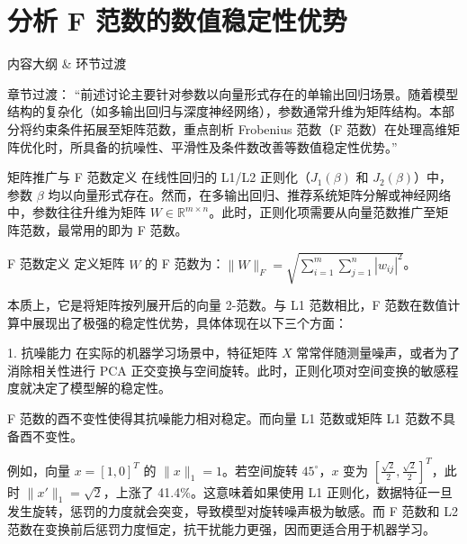 \documentclass[aspectratio=169]{beamer}
\begin{document}
\section{分析 F 范数的数值稳定性优势}

\begin{frame}{内容大纲 \& 环节过渡}
    \tableofcontents[currentsection]
    \vspace{0.5cm}
    \begin{block}{章节过渡：}
        “前述讨论主要针对参数以向量形式存在的单输出回归场景。随着模型结构的复杂化（如多输出回归与深度神经网络），参数通常升维为矩阵结构。本部分将约束条件拓展至矩阵范数，重点剖析 Frobenius 范数（F 范数）在处理高维矩阵优化时，所具备的抗噪性、平滑性及条件数改善等数值稳定性优势。”
    \end{block}
\end{frame}

\begin{frame}{矩阵推广与 F 范数定义}
    在线性回归的 L1/L2 正则化（$J_1(\beta)$ 和 $J_2(\beta)$）中，参数 $\beta$ 均以向量形式存在。然而，在多输出回归、推荐系统矩阵分解或神经网络中，参数往往升维为矩阵 $W \in \mathbb{R}^{m \times n}$。此时，正则化项需要从向量范数推广至矩阵范数，最常用的即为 F 范数。
    
    \begin{block}{F 范数定义}
        定义矩阵 $W$ 的 F 范数为：$\|W\|_F = \sqrt{\sum_{i=1}^m \sum_{j=1}^n |w_{ij}|^2}$。
    \end{block}
    
    本质上，它是将矩阵按列展开后的向量 2-范数。与 L1 范数相比，F 范数在数值计算中展现出了极强的稳定性优势，具体体现在以下三个方面：
\end{frame}

\begin{frame}{1. 抗噪能力}
    在实际的机器学习场景中，特征矩阵 $X$ 常常伴随测量噪声，或者为了消除相关性进行 PCA 正交变换与空间旋转。此时，正则化项对空间变换的敏感程度就决定了模型解的稳定性。
    
    F 范数的酉不变性使得其抗噪能力相对稳定。而向量 L1 范数或矩阵 L1 范数不具备酉不变性。
    
    例如，向量 $x = [1, 0]^T$ 的 $\|x\|_1 = 1$。若空间旋转 $45^\circ$，$x$ 变为 $[\frac{\sqrt{2}}{2}, \frac{\sqrt{2}}{2}]^T$，此时 $\|x'\|_1 = \sqrt{2}$，上涨了 41.4\%。这意味着如果使用 L1 正则化，数据特征一旦发生旋转，惩罚的力度就会突变，导致模型对旋转噪声极为敏感。而 F 范数和 L2 范数在变换前后惩罚力度恒定，抗干扰能力更强，因而更适合用于机器学习。
\end{frame}
\end{document}
